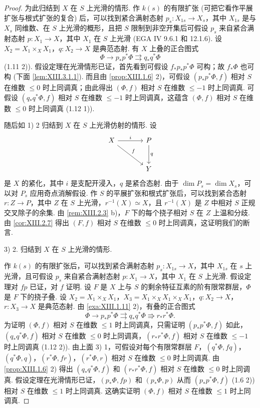 \begin{proof}
为此归结到 $X$ 在 $S$ 上光滑的情形. 作 $k(s)$ 的有限扩张 (可把它看作平展扩张与根式扩张的复合) 后，可以找到紧合满射态射 $p_s \colon X_{1s} \to X_s$，其中 $X_{1s}$ 是与 $X_s$ 同维数、在 $S$ 上光滑的概形，且把 $S$ 限制到非空开集后可假设 $p_s$ 来自紧合满射态射 $p \colon X_1 \to X$，其中 $X_1$ 在 $S$ 上光滑 (EGA IV 9.6.1 和 12.1.6). 设 $X_2 = X_1 \times_X X_1$，$q \colon X_2 \to X$ 是典范态射. 有 $X$ 上叠的正合图式
\[
\Phi \longrightarrow p_* p^{*} \Phi \rightrightarrows q_* q^{*} \Phi
\]
(1.11 2)). 假设定理在光滑情形已证，首先看到可假设 $f_* p_* p^{*} \Phi$ 可构；故 $f_* \Phi$ 也可构 (下面 \ref{lem:XIII.3.1.1}). 而且由 \ref{prop:XIII.1.6} 2)，可假设 $(p_* p^{*} \Phi, f)$ 相对 $S$ 在维数 $\leqslant 0$ 时上同调真；由此得出 $(\Phi, f)$ 相对 $S$ 在维数 $\leqslant -1$ 时上同调真. 可假设 $(q_* q^{*} \Phi, f)$ 相对 $S$ 在维数 $\leqslant -1$ 时上同调真，这蕴含 $(\Phi, f)$ 相对 $S$ 在维数 $\leqslant 0$ 时上同调真 (1.12 1)).

随后如 1) 2 归结到 $X$ 在 $S$ 上光滑仿射的情形. 设
\[
\begin{tikzcd}[row sep=large, column sep=large]
X \arrow[r,"{i}"] \arrow[dr,"{f}"] & P \arrow[d,"{q}"] \\
& Y
\end{tikzcd}
\]
是 $X$ 的紧化，其中 $i$ 是支配开浸入，$q$ 是紧合态射. 由于 $\dim P_s = \dim X_s$，可以对 $P_s$ 应用奇点消解假设. 作 $S$ 的平展扩张和根式扩张后，可以找到紧合态射 $r \colon Z \to P$，其中 $Z$ 在 $S$ 上光滑，$r^{-1}(X) \simeq X$，且 $r^{-1}(X)$ 是 $Z$ 中相对 $S$ 正规交叉除子的余集. 由 \ref{rem:XIII.2.3} b)，$F$ 下的每个挠子相对 $S$ 在 $Z$ 上温和分歧. 由 \ref{cor:XIII.2.7} 得出 $(F, f)$ 相对 $S$ 在维数 $\leqslant 0$ 时上同调真，这证明我们的断言.

3) 2. 归结到 $X$ 在 $S$ 上光滑的情形.

作 $k(s)$ 的有限扩张后，可以找到紧合满射态射 $p_s \colon X_{1s} \to X$，其中 $X_{1s}$ 在 $s$ 上光滑，且可假设 $p_s$ 来自紧合满射态射 $p \colon X_1 \to X$，其中 $X_1$ 在 $S$ 上光滑. 假设定理对 $fp$ 已证，对 $f$ 证明. 设 $F$ 是 $X$ 上与 $S$ 的剩余特征互素的阶有限常群层，$\Phi$ 是 $F$ 下的挠子叠. 设 $X_2 = X_1 \times_X X_1$，$X_3 = X_1 \times_X X_1 \times_X X_1$，$q \colon X_2 \to X$，$r \colon X_3 \to X$ 是典范态射. 由 \ref{exa:XIII.1.11} 2)，有叠的正合图式
\[
\Phi \longrightarrow p_* p^{*} \Phi \rightrightarrows q_* q^{*} \Phi \Rrightarrow r_* r^{*} \Phi.
\]
为证明 $(\Phi, f)$ 相对 $S$ 在维数 $\leqslant 1$ 时上同调真，只需证明 $(p_* p^{*} \Phi, f)$ 如此，$(q_* q^{*} \Phi, f)$ 相对 $S$ 在维数 $\leqslant 0$ 时上同调真，$(r_* r^{*} \Phi, f)$ 相对 $S$ 在维数 $\leqslant -1$ 时上同调真 (1.12 2)). 由上面 3) 1，可假设对每个有限常群层 $F$，$(q^{*} \Phi, fq)$，$(q^{*} \Phi, q)$，$(r^{*} \Phi, fr)$，$(r^{*} \Phi, r)$ 相对 $S$ 在维数 $\leqslant 0$ 时上同调真. 由 \ref{prop:XIII.1.6} 2) 得出 $(q_* q^{*} \Phi, f)$ 和 $(r_* r^{*} \Phi, f)$ 相对 $S$ 在维数 $\leqslant 0$ 时上同调真. 假设定理在光滑情形已证，$(p_* \Phi, fp)$ 和 $(p_* \Phi, p)$ 从而 $(p_* p^{*} \Phi, f)$ (1.6 2)) 相对 $S$ 在维数 $\leqslant 1$ 时上同调真. 这确实证明 $(\Phi, f)$ 相对 $S$ 在维数 $\leqslant 1$ 时上同调真.


\end{proof}
